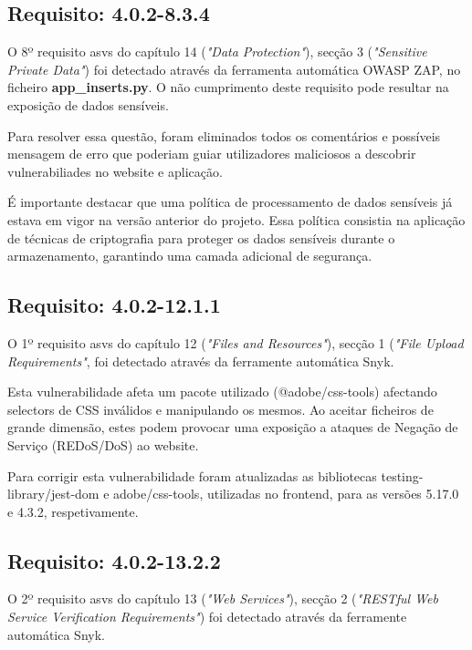 \subsection*{Requisito: 4.0.2-8.3.4}

O 8º requisito \ac{asvs} do capítulo 14 (\textit{"Data Protection"}), secção 3  (\textit{"Sensitive Private Data"}) foi detectado através da ferramenta automática OWASP ZAP, no ficheiro \textbf{app\_inserts.py}.
O não cumprimento deste requisito pode resultar na exposição de dados sensíveis.


Para resolver essa questão, foram eliminados todos os comentários e possíveis mensagem de erro que poderiam guiar utilizadores maliciosos a descobrir vulnerabiliades no website e aplicação.

É importante destacar que uma política de processamento de dados sensíveis já estava em vigor na versão anterior do projeto. Essa política consistia na aplicação de técnicas de criptografia para proteger os dados sensíveis durante o armazenamento, garantindo uma camada adicional de segurança.

\subsection*{Requisito: 4.0.2-12.1.1}

O 1º requisito \ac{asvs} do capítulo 12 (\textit{"Files and Resources"}), secção 1 (\textit{"File Upload Requirements"}, foi detectado através da ferramente automática Snyk.

Esta vulnerabilidade afeta um pacote utilizado (@adobe/css-tools) afectando selectors de CSS inválidos e manipulando os mesmos. Ao aceitar ficheiros de grande dimensão, estes podem provocar uma exposição a ataques de Negação de Serviço (REDoS/DoS) ao website.

Para corrigir esta vulnerabilidade foram atualizadas as bibliotecas testing-library/jest-dom e  adobe/css-tools, utilizadas no frontend, para as versões 5.17.0 e 4.3.2, respetivamente.

\subsection*{Requisito: 4.0.2-13.2.2}

O 2º requisito \ac{asvs} do capítulo 13 (\textit{"Web Services"}), secção 2  (\textit{"RESTful Web Service Verification Requirements"}) foi detectado através da ferramente automática Snyk.



